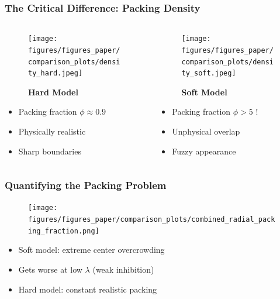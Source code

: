 \documentclass[10pt,t]{beamer}
\begin{document}
\begin{frame}
    \frametitle{The Critical Difference: Packing Density}

    \begin{columns}
        \begin{column}{0.5\textwidth}
            \begin{figure}
                \centering
                \texttt{[image: figures/figures\_paper/comparison\_plots/density\_hard.jpeg]}
                \caption*{\textbf{Hard Model}}
            \end{figure}

            \vspace{-0.2cm}

            \begin{itemize}
                \item Packing fraction $\phi \approx 0.9$
                \item Physically realistic
                \item Sharp boundaries
            \end{itemize}
        \end{column}

        \begin{column}{0.5\textwidth}
            \begin{figure}
                \centering
                \texttt{[image: figures/figures\_paper/comparison\_plots/density\_soft.jpeg]}
                \caption*{\textbf{Soft Model}}
            \end{figure}

            \vspace{-0.2cm}

            \begin{itemize}
                \item Packing fraction $\phi > 5$ !
                \item Unphysical overlap
                \item Fuzzy appearance
            \end{itemize}
        \end{column}
    \end{columns}

\end{frame}

\begin{frame}
    \frametitle{Quantifying the Packing Problem}

    \begin{figure}
        \centering
        \texttt{[image: figures/figures\_paper/comparison\_plots/combined\_radial\_packing\_fraction.png]}
    \end{figure}

    \begin{itemize}
        \item Soft model: extreme center overcrowding
        \item Gets worse at low $\lambda$ (weak inhibition)
        \item Hard model: constant realistic packing
    \end{itemize}

\end{frame}
\end{document}
